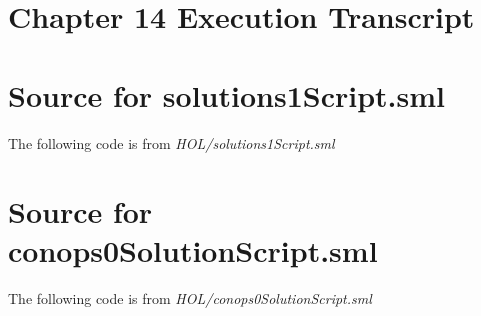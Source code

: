 \documentclass[11pt, twoside]{article}
\begin{document}
\HOLconopsZeroSolutionTheoremsApRuleActiveXXthm
\HOLconopsZeroSolutionTheoremsApRuleStandDownXXthm
\HOLconopsZeroSolutionTheoremsOpRuleAbortXXthm
\HOLconopsZeroSolutionTheoremsOpRuleLaunchXXthm

\section{Chapter 14 Execution Transcript}
\label{sec:chapter-14-execution}




\HOLindex

\appendix{}

\section{Source for solutions1Script.sml}
\label{sec:source-solut}


The following code is from \emph{HOL/solutions1Script.sml}


\section{Source for conops0SolutionScript.sml}
\label{sec:source-conops0s}

The following code is from \emph{HOL/conops0SolutionScript.sml}

\end{document}
